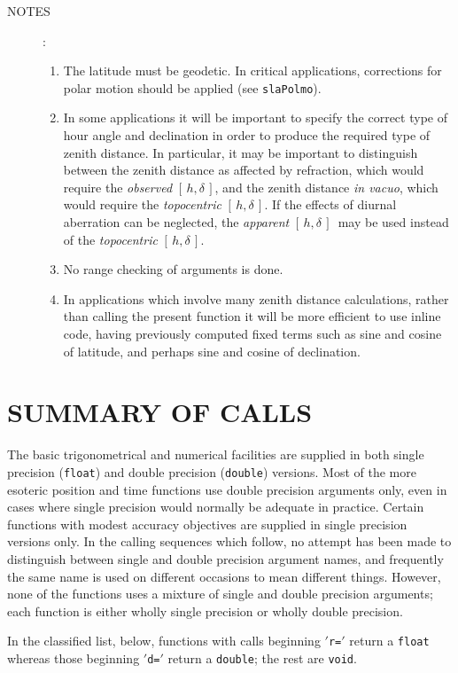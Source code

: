 \documentclass[11pt,fleqn,twoside]{article}
\renewcommand{\_}{{\tt\char'137}}     %
\newcommand{\hadec}     {$[\,h,\delta\,]$}
\newlength{\oldspacing}
\newcommand{\notes}[1]
{
  \goodbreak
  \setlength{\oldspacing}{\topsep}
  \setlength{\topsep}{0.3ex}
  \begin{description}
    \item[NOTES]:
        #1
  \end{description}
  \setlength{\topsep}{\oldspacing}
}
\newcommand{\fstring}[1]{\hspace{0.05em}\mbox{$'${\tt#1}\hspace{0.09em}$'$}}
\begin{document}
\notes
{
 \begin{enumerate}
  \item The latitude must be geodetic.  In critical applications,
        corrections for polar motion should be applied (see {\tt slaPolmo}).
  \item In some applications it will be important to specify the
        correct type of hour angle and declination in order to
        produce the required type
        of zenith distance.  In particular, it may be
        important to distinguish between the zenith distance
        as affected by refraction, which would require the
        {\it observed}\/ \hadec, and the zenith distance {\it in vacuo},
        which would require the {\it topocentric}\/ \hadec.  If
        the effects of diurnal aberration can be neglected, the
        {\it apparent}\/ \hadec\ may be used instead of the
        {\it topocentric}\/ \hadec.
  \item No range checking of arguments is done.
  \item In applications which involve many zenith distance calculations,
        rather than calling the present function it will be more
        efficient to use inline code, having previously computed fixed
        terms such as sine and cosine of latitude, and perhaps sine and
        cosine of declination.
 \end{enumerate}
}
\fi
\vfill
\pagebreak

\section{SUMMARY OF CALLS}
The basic trigonometrical and numerical facilities are supplied in both
single precision ({\tt float}) and double precision ({\tt double}) versions.
Most of the more esoteric position and time functions use double precision
arguments only, even in cases where single precision would normally
be adequate in practice.
Certain functions with modest accuracy objectives are supplied in
single precision versions only.
In the calling sequences which follow, no attempt has been made
to distinguish between single and double precision argument names,
and frequently the same name is used on different occasions to
mean different things.
However, none of the functions uses a mixture of single and
double precision arguments;  each function is either wholly
single precision or wholly double precision.
 
In the classified list, below, functions with calls beginning \fstring{r=}
return a {\tt float} whereas those beginning \fstring{d=}
return a {\tt double}; the rest are {\tt void}.
 
\end{document}
